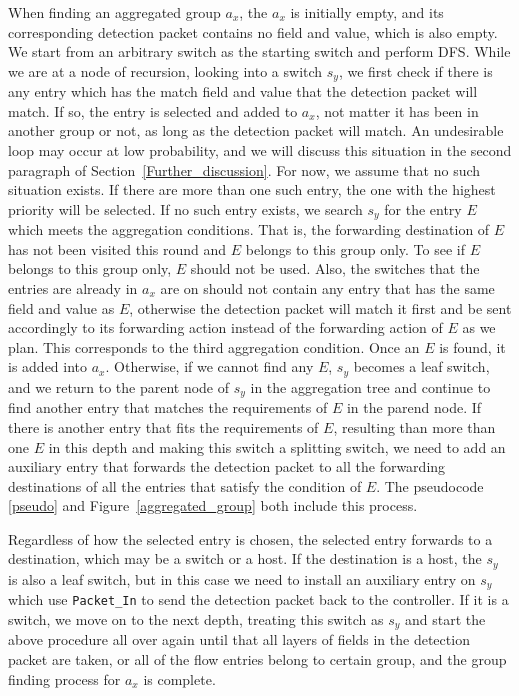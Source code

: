 \documentclass[conference]{IEEEtran}
\begin{document}
When finding an aggregated group $a_x$, the $a_x$ is initially empty, and its corresponding detection packet contains no field and value, which is also empty. We start from an arbitrary switch as the starting switch and perform DFS. While we are at a node of recursion, looking into a switch $s_y$, we first check if there is any entry which has the match field and value that the detection packet will match. If so, the entry is selected and added to $a_x$, not matter it has been in another group or not, as long as the detection packet will match. An undesirable loop may occur at low probability, and we will discuss this situation in the second paragraph of Section~\ref{Further_discussion}. For now, we assume that no such situation exists. If there are more than one such entry, the one with the highest priority will be selected. If no such entry exists, we search $s_y$ for the entry $E$ which meets the aggregation conditions. That is, the forwarding destination of $E$ has not been visited this round and $E$ belongs to this group only. To see if $E$ belongs to this group only, $E$ should not be used. Also, the switches that the entries are already in $a_x$ are on should not contain any entry that has the same field and value as $E$, otherwise the detection packet will match it first and be sent accordingly to its forwarding action instead of the forwarding action of $E$ as we plan. This corresponds to the third aggregation condition. Once an $E$ is found, it is added into $a_x$. Otherwise, if we cannot find any $E$, $s_y$ becomes a leaf switch, and we return to the parent node of $s_y$ in the aggregation tree and continue to find another entry that matches the requirements of $E$ in the parend node. If there is another entry that fits the requirements of $E$, resulting than more than one $E$ in this depth and making this switch a splitting switch, we need to add an auxiliary entry that forwards the detection packet to all the forwarding destinations of all the entries that satisfy the condition of $E$. The pseudocode \ref{pseudo} and Figure~\ref{aggregated_group} both include this process.

Regardless of how the selected entry is chosen, the selected entry forwards to a destination, which may be a switch or a host. If the destination is a host, the $s_y$ is also a leaf switch, but in this case we need to install an auxiliary entry on $s_y$ which use \texttt{Packet\_In} to send the detection packet back to the controller. If it is a switch, we move on to the next depth, treating this switch as $s_y$ and start the above procedure all over again until that all layers of fields in the detection packet are taken, or all of the flow entries belong to certain group, and the group finding process for $a_x$ is complete.
\end{document}
